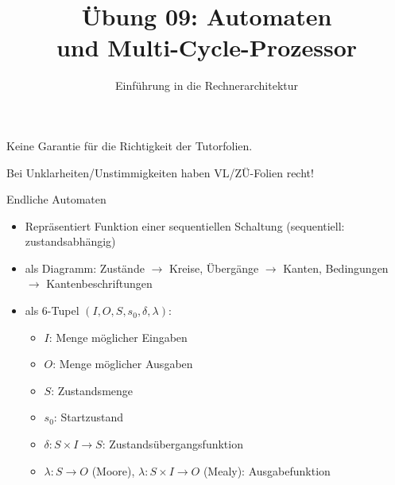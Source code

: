 

\title{Übung 09: Automaten \\und
	Multi-Cycle-Prozessor}
\subtitle{Einführung in die Rechnerarchitektur}
\date{}



\maketitle

\begin{frame}[c, fragile]{}{}
	\begin{center}
		\LARGE  Keine Garantie für die Richtigkeit der Tutorfolien.

		\Large Bei Unklarheiten/Unstimmigkeiten haben VL/ZÜ-Folien recht!
	\end{center}
\end{frame}

\begin{frame}[fragile, c]{Endliche Automaten}{}
	\begin{itemize}
		\item Repräsentiert Funktion einer sequentiellen Schaltung (sequentiell: zustandsabhängig)
		\item als Diagramm: Zustände $\rightarrow$ Kreise, Übergänge $\rightarrow$ Kanten, Bedingungen $\rightarrow$ Kantenbeschriftungen
		\item als 6-Tupel $(I, O, S, s_0, \delta, \lambda)$:
		      \begin{itemize}
			      \item $I$: Menge möglicher Eingaben
			      \item $O$: Menge möglicher Ausgaben
			      \item $S$: Zustandsmenge
			      \item $s_0$: Startzustand
			      \item $\delta:  S\times I\rightarrow S$: Zustandsübergangsfunktion
			      \item $\lambda: S\rightarrow O$ (Moore), $\lambda: S\times I\rightarrow O$ (Mealy): Ausgabefunktion
		      \end{itemize}
	\end{itemize}
\end{frame}

